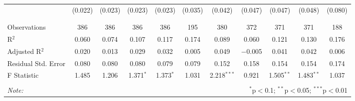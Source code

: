 \begin{table}[H]
\begin{tabular}{@{\extracolsep{4pt}}lcccccccccc}
  & (0.022) & (0.023) & (0.023) & (0.023) & (0.035) & (0.042) & (0.047) & (0.047) & (0.048) & (0.080) \\ 
  & & & & & & & & & & \\ 
\hline \\[-1.8ex] 
Observations & 386 & 386 & 386 & 386 & 195 & 380 & 372 & 371 & 371 & 188 \\ 
R$^{2}$ & 0.060 & 0.074 & 0.107 & 0.117 & 0.174 & 0.089 & 0.060 & 0.121 & 0.130 & 0.176 \\ 
Adjusted R$^{2}$ & 0.020 & 0.013 & 0.029 & 0.032 & 0.005 & 0.049 & $-$0.005 & 0.041 & 0.042 & 0.006 \\ 
Residual Std. Error & 0.080 & 0.080 & 0.080 & 0.079 & 0.079 & 0.152 & 0.158 & 0.154 & 0.154 & 0.174 \\ 
F Statistic & 1.485 & 1.206 & 1.371$^{*}$ & 1.373$^{*}$ & 1.031 & 2.218$^{***}$ & 0.921 & 1.505$^{**}$ & 1.483$^{**}$ & 1.037 \\ 
\hline 
\hline \\[-1.8ex] 
\textit{Note:}  & \multicolumn{10}{r}{$^{*}$p$<$0.1; $^{**}$p$<$0.05; $^{***}$p$<$0.01} \\ 
\end{tabular} 
\end{table} 
